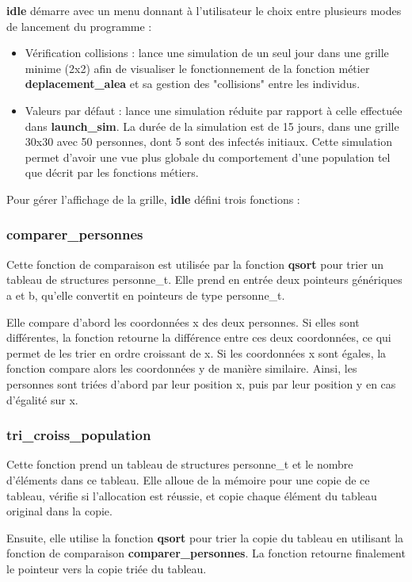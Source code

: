\documentclass[12pt,french,titlepage]{article}
\begin{document}
\textbf{idle} démarre avec un menu donnant à l'utilisateur le choix entre plusieurs modes de lancement du programme :
\begin{itemize}
\item Vérification collisions : lance une simulation de un seul jour dans une grille minime (2x2) afin de visualiser le fonctionnement de la fonction métier \textbf{deplacement\_alea} et sa gestion des "collisions" entre les individus.

\item Valeurs par défaut : lance une simulation réduite par rapport à celle effectuée dans \textbf{launch\_sim}. La durée de la simulation est de 15 jours, dans une grille 30x30 avec 50 personnes, dont 5 sont des infectés initiaux. Cette simulation permet d'avoir une vue plus globale du comportement d'une population tel que décrit par les fonctions métiers.\\
\end{itemize}

Pour gérer l'affichage de la grille, \textbf{idle} défini trois fonctions :
\subsubsection*{comparer\_personnes}
Cette fonction de comparaison est utilisée par la fonction \textbf{qsort} pour trier un tableau de structures personne\_t. Elle prend en entrée deux pointeurs génériques a et b, qu'elle convertit en pointeurs de type personne\_t.

Elle compare d'abord les coordonnées x des deux personnes. Si elles sont différentes, la fonction retourne la différence entre ces deux coordonnées, ce qui permet de les trier en ordre croissant de x. Si les coordonnées x sont égales, la fonction compare alors les coordonnées y de manière similaire. Ainsi, les personnes sont triées d'abord par leur position x, puis par leur position y en cas d'égalité sur x.

\subsubsection*{tri\_croiss\_population}
Cette fonction prend un tableau de structures personne\_t et le nombre d'éléments dans ce tableau. Elle alloue de la mémoire pour une copie de ce tableau, vérifie si l'allocation est réussie, et copie chaque élément du tableau original dans la copie.

Ensuite, elle utilise la fonction \textbf{qsort} pour trier la copie du tableau en utilisant la fonction de comparaison \textbf{comparer\_personnes}. La fonction retourne finalement le pointeur vers la copie triée du tableau.
\end{document}
